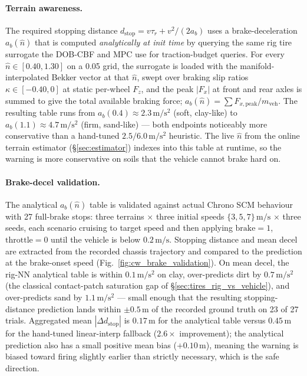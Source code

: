 \documentclass[conference,letterpaper,10pt]{IEEEtran}
\begin{document}
\paragraph{Terrain awareness.} The required stopping distance
$d_{\mathrm{stop}}=v\tau_{r}+v^{2}/(2a_{b})$ uses a brake-deceleration
$a_{b}(\hat n)$ that is computed \emph{analytically at init time} by
querying the same rig tire surrogate the
DOB-CBF and MPC use for traction-budget queries. For every $\hat n
\in [0.40,1.30]$ on a 0.05 grid, the surrogate is loaded with the
manifold-interpolated Bekker vector at that $\hat n$, swept over
braking slip ratios $\kappa\in[-0.40,0]$ at static per-wheel $F_z$,
and the peak $|F_x|$ at front and rear axles is summed to give the
total available braking force; $a_b(\hat n)=\sum F_{x,\mathrm{peak}}
/ m_{\mathrm{veh}}$. The resulting table runs from
$a_b(0.4)\!\approx\!2.3\,\mathrm{m/s^{2}}$ (soft, clay-like) to
$a_b(1.1)\!\approx\!4.7\,\mathrm{m/s^{2}}$ (firm, sand-like) --- both
endpoints noticeably more conservative than a hand-tuned
$2.5/6.0\,\mathrm{m/s^{2}}$ heuristic. The live $\hat n$ from the online terrain estimator
(\S\ref{sec:estimator}) indexes into this table at runtime, so the
warning is more conservative on soils that the vehicle cannot brake
hard on.

\paragraph{Brake-decel validation.}
The analytical $a_b(\hat n)$ table is validated against actual Chrono
SCM behaviour with 27 full-brake stops: three terrains $\times$
three initial speeds $\{3,5,7\}\,\mathrm{m/s}$ $\times$ three seeds,
each scenario cruising to target speed and then applying
$\mathrm{brake}=1$, $\mathrm{throttle}=0$ until the vehicle is below
$0.2\,\mathrm{m/s}$. Stopping distance and mean decel are extracted
from the recorded chassis trajectory and compared to the prediction
at the brake-onset speed (Fig.~\ref{fig:cw_brake_validation}). On
mean decel, the rig-NN analytical table is within $0.1\,\mathrm{m/s^{2}}$
on clay, over-predicts dirt by $0.7\,\mathrm{m/s^{2}}$ (the
classical contact-patch saturation gap of \S\ref{sec:tires_rig_vs_vehicle}),
and over-predicts sand by $1.1\,\mathrm{m/s^{2}}$ --- small enough
that the resulting stopping-distance prediction lands within
$\pm 0.5\,\mathrm{m}$ of the recorded ground truth on 23 of 27
trials. Aggregated mean $|\Delta d_{\mathrm{stop}}|$ is
$0.17\,\mathrm{m}$ for the analytical table versus $0.45\,\mathrm{m}$
for the hand-tuned linear-interp fallback ($2.6\times$ improvement);
the analytical prediction also has a small positive mean bias
($+0.10\,\mathrm{m}$), meaning the warning is biased toward firing
slightly earlier than strictly necessary, which is the safe
direction.
\end{document}
